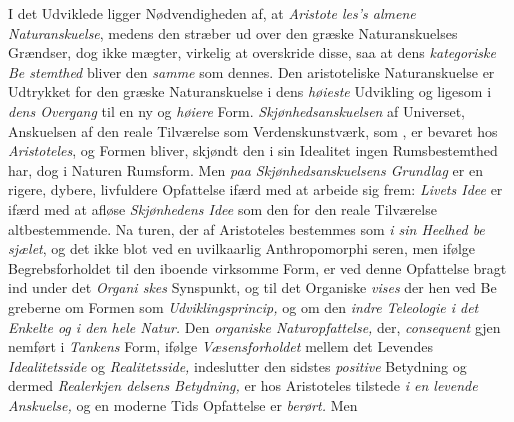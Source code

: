I det Udviklede ligger Nødvendigheden af, at \emph{Aristote\-%
les's almene Naturanskuelse}, medens den stræber ud
over den græske Naturanskuelses Grændser, dog ikke mægter,
virkelig at overskride disse, saa at dens \emph{kategoriske Be\-%
stemthed} bliver den \emph{samme} som dennes. Den aristoteliske
Naturanskuelse er Udtrykket for den græske Naturanskuelse i
dens \emph{høieste} Udvikling og ligesom i \emph{dens Overgang} til en
ny og \emph{høiere} Form. \emph{Skjønhedsanskuelsen} af Universet,
Anskuelsen af den reale Tilværelse som Verdenskunstværk, som
, er bevaret hos \emph{Aristoteles}, og Formen bliver, skjøndt
den i sin Idealitet ingen Rumsbestemthed har, dog i Naturen
Rumsform. Men \emph{paa Skjønhedsanskuelsens Grundlag}
er en rigere, dybere, livfuldere Opfattelse ifærd med at arbeide
sig frem: \emph{Livets Idee} er ifærd med at afløse \emph{Skjønhedens
Idee} som den for den reale Tilværelse altbestemmende. Na\-%
turen, der af Aristoteles bestemmes som \emph{i sin Heelhed be\-%
sjælet}, og det ikke blot ved en uvilkaarlig Anthropomorphi\-%
seren, men ifølge Begrebsforholdet til den iboende virksomme
%
Form, er ved denne Opfattelse bragt ind under det \emph{Organi\-%
skes} Synspunkt, og til det Organiske \emph{vises} der hen ved Be\-%
greberne om Formen som \emph{Udviklingsprincip,} og om den
\emph{indre Teleologie i det Enkelte og i den hele Natur.}
Den \emph{organiske Naturopfattelse,} der, \emph{consequent} gjen\-%
nemført i \emph{Tankens} Form, ifølge \emph{Væsensforholdet} mellem
det Levendes \emph{Idealitetsside} og \emph{Realitetsside,} indeslutter
den sidstes \emph{positive} Betydning og dermed \emph{Realerkjen\-%
delsens Betydning,} er hos Aristoteles tilstede \emph{i en levende
Anskuelse,} og en moderne Tids Opfattelse er \emph{berørt.} Men
